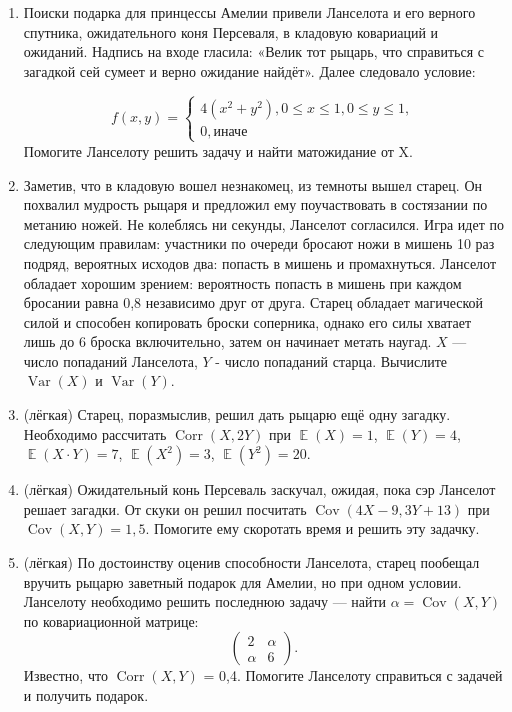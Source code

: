 \documentclass[a4paper,12pt]{article}
\DeclareMathOperator{\Var}{Var}
\DeclareMathOperator{\Cov}{Cov}
\DeclareMathOperator{\Corr}{Corr}
\DeclareMathOperator{\E}{\mathbb{E}}
\begin{document}
\begin{enumerate} %
\item Поиски подарка для принцессы Амелии привели Ланселота и его верного спутника, ожидательного коня Персеваля, в кладовую ковариаций и ожиданий. Надпись на входе гласила: «Велик тот рыцарь, что справиться с загадкой сей сумеет и верно ожидание найдёт». Далее следовало условие:

\[
   f(x, y)=
   \begin{cases}
   4(x^2 + y^2), 0 \leq x \leq 1, 0 \leq y \leq 1, \\
    0, \text{иначе}
    \end{cases}
\]
Помогите Ланселоту решить задачу и найти матожидание от X.
\item Заметив, что в кладовую вошел незнакомец, из темноты вышел старец. Он похвалил мудрость рыцаря и предложил ему поучаствовать в состязании по метанию ножей. Не колеблясь ни секунды, Ланселот согласился. Игра идет по следующим правилам: участники по очереди бросают ножи в мишень 10 раз подряд, вероятных исходов два: попасть в мишень и промахнуться. Ланселот обладает хорошим зрением: вероятность попасть в мишень при каждом бросании равна 0,8 независимо друг от друга. Старец обладает магической силой и способен копировать броски соперника, однако его силы хватает лишь до 6 броска включительно, затем он начинает метать наугад. $X$ — число попаданий Ланселота, $Y$ - число попаданий старца. Вычислите $\Var(X)$ и $\Var(Y)$.
\item (лёгкая) Старец, поразмыслив, решил дать рыцарю ещё одну загадку. Необходимо рассчитать $\Corr(X, 2Y)$ при $\E(X)=1$, $\E(Y)=4$, $\E(X\cdot Y)=7$, $\E(X^2)=3$, $\E(Y^2)=20$.
\item (лёгкая) Ожидательный конь Персеваль заскучал, ожидая, пока сэр Ланселот решает загадки. От скуки он решил посчитать $\Cov(4X-9, 3Y+13)$ при $\Cov(X, Y)=1,5$. Помогите ему скоротать время и решить эту задачку.
\item (лёгкая) По достоинству оценив способности Ланселота, старец пообещал вручить рыцарю заветный подарок для Амелии, но при одном условии. Ланселоту необходимо решить последнюю задачу — найти $\alpha = \Cov(X, Y)$ по ковариационной матрице:
\[
\begin{pmatrix}
2 & \alpha \\
\alpha & 6
\end{pmatrix}.
\]
Известно, что $\Corr(X, Y) $ = 0,4.
Помогите Ланселоту справиться с задачей и получить подарок.
\end{enumerate}
\end{document}
